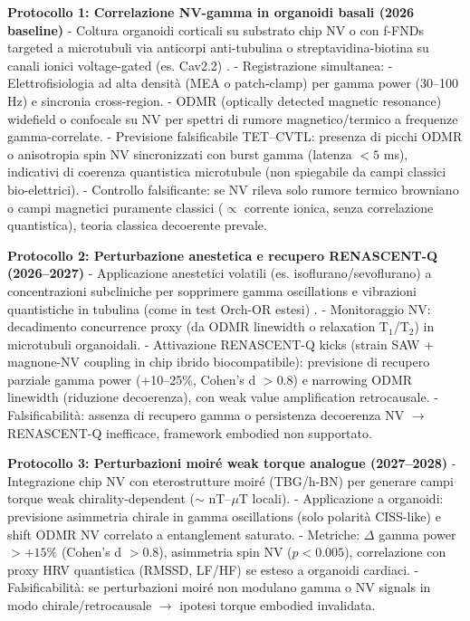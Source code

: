 \documentclass[11pt,a4paper]{article}
\let\oldcite\cite
\renewcommand{\cite}{\protect\oldcite}
\theoremstyle{plain}
\theoremstyle{definition}
\begin{document}
\vspace{0.2cm}

\textbf{Protocollo 1: Correlazione NV-gamma in organoidi basali (2026 baseline)}  
- Coltura organoidi corticali su substrato chip NV o con f-FNDs targeted a microtubuli via anticorpi anti-tubulina o streptavidina-biotina su canali ionici voltage-gated (es. Cav2.2) \cite{Costa2024}.  
- Registrazione simultanea:  
  - Elettrofisiologia ad alta densità (MEA o patch-clamp) per gamma power (30–100 Hz) e sincronia cross-region.  
  - ODMR (optically detected magnetic resonance) widefield o confocale su NV per spettri di rumore magnetico/termico a frequenze gamma-correlate.  
- Previsione falsificabile TET–CVTL: presenza di picchi ODMR o anisotropia spin NV sincronizzati con burst gamma (latenza $<5$ ms), indicativi di coerenza quantistica microtubule (non spiegabile da campi classici bio-elettrici).  
- Controllo falsificante: se NV rileva solo rumore termico browniano o campi magnetici puramente classici ($\propto$ corrente ionica, senza correlazione quantistica), teoria classica decoerente prevale.

\vspace{0.2cm}

\textbf{Protocollo 2: Perturbazione anestetica e recupero RENASCENT-Q (2026–2027)}  
- Applicazione anestetici volatili (es. isoflurano/sevoflurano) a concentrazioni subcliniche per sopprimere gamma oscillations e vibrazioni quantistiche in tubulina (come in test Orch-OR estesi) \cite{Hameroff2022, Wiest2025niaf011}.  
- Monitoraggio NV: decadimento concurrence proxy (da ODMR linewidth o relaxation T$_1$/T$_2$) in microtubuli organoidali.  
- Attivazione RENASCENT-Q kicks (strain SAW + magnone-NV coupling in chip ibrido biocompatibile): previsione di recupero parziale gamma power (+10–25\%, Cohen's d $>0.8$) e narrowing ODMR linewidth (riduzione decoerenza), con weak value amplification retrocausale.  
- Falsificabilità: assenza di recupero gamma o persistenza decoerenza NV $\to$ RENASCENT-Q inefficace, framework embodied non supportato.

\vspace{0.2cm}

\textbf{Protocollo 3: Perturbazioni moiré weak torque analogue (2027–2028)}  
- Integrazione chip NV con eterostrutture moiré (TBG/h-BN) per generare campi torque weak chirality-dependent ($\sim$ nT–$\mu$T locali).  
- Applicazione a organoidi: previsione asimmetria chirale in gamma oscillations (solo polarità CISS-like) e shift ODMR NV correlato a entanglement saturato.  
- Metriche: $\Delta$ gamma power $> +15\%$ (Cohen's d $>0.8$), asimmetria spin NV ($p < 0.005$), correlazione con proxy HRV quantistica (RMSSD, LF/HF) se esteso a organoidi cardiaci.  
- Falsificabilità: se perturbazioni moiré non modulano gamma o NV signals in modo chirale/retrocausale $\to$ ipotesi torque embodied invalidata.
\end{document}
